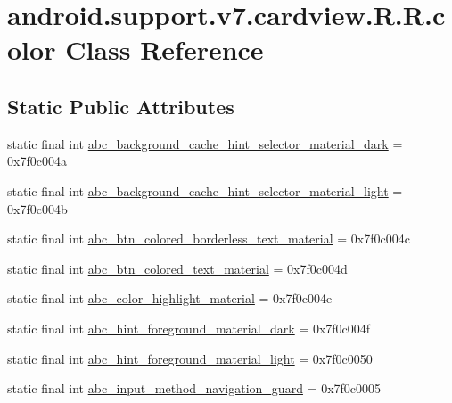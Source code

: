 \hypertarget{classandroid_1_1support_1_1v7_1_1cardview_1_1_r_1_1color}{
\section{android.support.v7.cardview.R.R.color Class Reference}
\label{classandroid_1_1support_1_1v7_1_1cardview_1_1_r_1_1color}
}
\subsection*{Static Public Attributes}
\begin{CompactItemize}
\item 
static final int \hyperlink{classandroid_1_1support_1_1v7_1_1cardview_1_1_r_1_1color_f3984ac3eb5a4cfcd806563e9c586fb8}{abc\_\-background\_\-cache\_\-hint\_\-selector\_\-material\_\-dark} = 0x7f0c004a
\item 
static final int \hyperlink{classandroid_1_1support_1_1v7_1_1cardview_1_1_r_1_1color_1c96c389898d74f2fbe6775530c626f4}{abc\_\-background\_\-cache\_\-hint\_\-selector\_\-material\_\-light} = 0x7f0c004b
\item 
static final int \hyperlink{classandroid_1_1support_1_1v7_1_1cardview_1_1_r_1_1color_64b2dce22e6578949dfa2c4550e209be}{abc\_\-btn\_\-colored\_\-borderless\_\-text\_\-material} = 0x7f0c004c
\item 
static final int \hyperlink{classandroid_1_1support_1_1v7_1_1cardview_1_1_r_1_1color_a90444bdeae82dac62f946038d299f8c}{abc\_\-btn\_\-colored\_\-text\_\-material} = 0x7f0c004d
\item 
static final int \hyperlink{classandroid_1_1support_1_1v7_1_1cardview_1_1_r_1_1color_6ef0a47aaffbe915fd868f452c378105}{abc\_\-color\_\-highlight\_\-material} = 0x7f0c004e
\item 
static final int \hyperlink{classandroid_1_1support_1_1v7_1_1cardview_1_1_r_1_1color_8cc84fb68249cb7edb6aba39e0e3927c}{abc\_\-hint\_\-foreground\_\-material\_\-dark} = 0x7f0c004f
\item 
static final int \hyperlink{classandroid_1_1support_1_1v7_1_1cardview_1_1_r_1_1color_595d9c3ded49624d1a1ac9e10b58eae1}{abc\_\-hint\_\-foreground\_\-material\_\-light} = 0x7f0c0050
\item 
static final int \hyperlink{classandroid_1_1support_1_1v7_1_1cardview_1_1_r_1_1color_a42aa8821e0163fa55614d2d69ffe43f}{abc\_\-input\_\-method\_\-navigation\_\-guard} = 0x7f0c0005
\item 

\end{CompactItemize}
